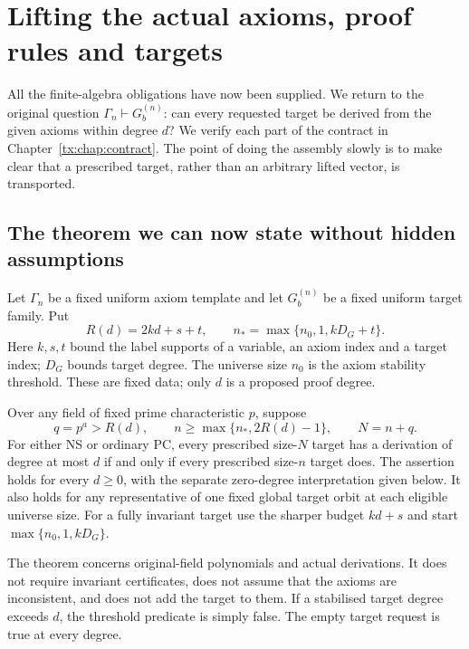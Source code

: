\chapter{Lifting the actual axioms, proof rules and targets}
\label{tx:chap:assemble-transfer}
All the finite-algebra obligations have now been supplied. We return
to the original question $\Gamma_n\vdash G_b^{(n)}$: can every requested
target be derived from the given axioms within degree $d$? We verify each part of the contract
in Chapter~\ref{tx:chap:contract}. The point of doing the assembly slowly
is to make clear that a prescribed target, rather than an arbitrary
lifted vector, is transported.

\section{The theorem we can now state without hidden assumptions}
Let $\Gamma_n$ be a fixed uniform axiom template and let $G_b^{(n)}$ be
a fixed uniform target family. Put
\[
 R(d)=2kd+s+t,\qquad n_*=\max\{n_0,1,kD_G+t\}.
\]
Here $k,s,t$ bound the label supports of a variable, an axiom index and
a target index; $D_G$ bounds target degree. The universe size $n_0$ is the axiom
stability threshold. These are fixed data; only $d$ is a proposed proof degree.

\begin{theorem}\label{tx:thm:transfer}
Over any field of fixed prime characteristic $p$, suppose
\[
 q=p^a>R(d),\qquad n\ge\max\{n_*,2R(d)-1\},\qquad N=n+q.
\]
For either NS or ordinary PC, every prescribed size-$N$ target has a
derivation of degree at most $d$ if and only if every prescribed size-$n$
target does. The assertion holds for every $d\ge0$, with the separate
zero-degree interpretation given below. It also holds for any
representative of one fixed global target orbit at each eligible universe size.
For a fully invariant target use the sharper budget $kd+s$ and start
$\max\{n_0,1,kD_G\}$.
\end{theorem}

The theorem concerns original-field polynomials and actual derivations.
It does not require invariant certificates, does not assume that the
axioms are inconsistent, and does not add the target to them. If a
stabilised target degree exceeds $d$, the threshold predicate is simply
false. The empty target request is true at every degree.

